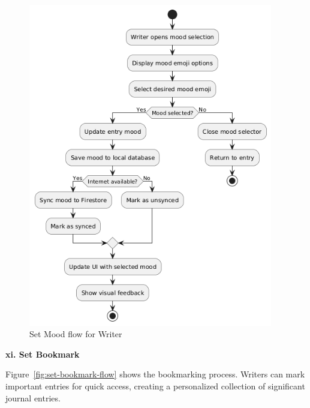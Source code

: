 \begin{figure}[H]
\centering
\includegraphics[width=0.95\textwidth,height=0.7\textheight,keepaspectratio]{files/imgs/set_mood_flow.png}
\caption{Set Mood flow for Writer}
\label{fig:set-mood-flow}
\end{figure}
\clearpage

\textbf{xi. Set Bookmark}

Figure~\ref{fig:set-bookmark-flow} shows the bookmarking process. Writers can mark important entries for quick access, creating a personalized collection of significant journal entries.

